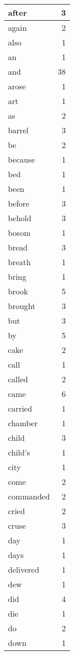 \begin{center}
\begin{longtable}{l|r}
after & 3\\ \hline 
again & 2\\ \hline 
also & 1\\ \hline 
an & 1\\ \hline 
and & 38\\ \hline 
arose & 1\\ \hline 
art & 1\\ \hline 
as & 2\\ \hline 
barrel & 3\\ \hline 
be & 2\\ \hline 
because & 1\\ \hline 
bed & 1\\ \hline 
been & 1\\ \hline 
before & 3\\ \hline 
behold & 3\\ \hline 
bosom & 1\\ \hline 
bread & 3\\ \hline 
breath & 1\\ \hline 
bring & 1\\ \hline 
brook & 5\\ \hline 
brought & 3\\ \hline 
but & 3\\ \hline 
by & 5\\ \hline 
cake & 2\\ \hline 
call & 1\\ \hline 
called & 2\\ \hline 
came & 6\\ \hline 
carried & 1\\ \hline 
chamber & 1\\ \hline 
child & 3\\ \hline 
child's & 1\\ \hline 
city & 1\\ \hline 
come & 2\\ \hline 
commanded & 2\\ \hline 
cried & 2\\ \hline 
cruse & 3\\ \hline 
day & 1\\ \hline 
days & 1\\ \hline 
delivered & 1\\ \hline 
dew & 1\\ \hline 
did & 4\\ \hline 
die & 1\\ \hline 
do & 2\\ \hline 
down & 1\\ \hline 

\end{longtable}
\end{center}
